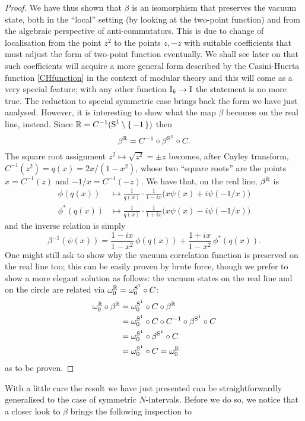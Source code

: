 \begin{proof}
\bigskip 
We have thus shown that $\beta$ is an isomorphism that 
preserves the vacuum state, both in the ``local'' setting
(by looking at the two-point function) and from the 
algebraic perspective of anti-commutators.
This is due to change of localisation from the point 
$z^2$ to the points $z,-z$ with suitable coefficients that
must adjust the form of two-point function eventually. We shall 
see later on that such coefficients will acquire a more
general form described by the Casini-Huerta function 
\eqref{CHfunction} in the context of modular theory and this 
will come as a very special feature; with any other function 
$\textrm{I}_k\to \textrm{I}$ the statement is no more true. The 
reduction to special symmetric case brings back the form 
we have just analysed. However, it is 
interesting to show what the map $\beta$ becomes on the 
real line, instead. Since $\mathbb{R}=C^{-1}(\textrm{S}^1\setminus\set{-1})$ 
then 
\[
\beta^{\mathbb{R}}=C^{-1}\circ\beta^{\textrm{S}^1}\circ C.
\]
The square root assignment $z^2\mapsto\sqrt{z^2}=\pm z$
becomes, after Cayley transform, 
$C^{-1}(z^2)=q(x)=2x/(1-x^2)$, whose two 
``square roots'' are the points $x=C^{-1}(z)$ and
$-1/x=C^{-1}(-z)$.
We have that, on the real line, $\beta^{\mathbb{R}}$ is
\begin{align*}
\phi(q(x))&\mapsto\frac{1}{q(x)}\cdot\frac{1}{1-ix}
\Big(x\psi(x)+i\psi(-1/x)\Big)\\
\phi^*(q(x))&\mapsto\frac{1}{q(x)}\cdot\frac{1}{1+ix}
\Big(x\psi(x)-i\psi(-1/x)\Big)
\end{align*}
and the inverse relation is simply
\[
\beta^{-1}(\psi(x))=\frac{1-ix}{1-x^2}\,\phi(q(x)) +
\frac{1+ix}{1-x^2}\,\phi^*(q(x)).
\]
One might still ask to show why the vacuum correlation 
function is preserved on the real line too; this can be
easily proven by brute force, though we prefer to show a
more elegant solution as follows: the vacuum states on the 
real line and on the circle are related via $\omega_0^{\mathbb{R}}=
\omega_0^{\textrm{S}^1}\circ C$:
\begin{align*}
\omega_0^{\mathbb{R}}\circ\beta^{\mathbb{R}}&=\omega_0^{\textrm{S}^1}\circ C\circ\beta^{\mathbb{R}}\\
&=\omega_0^{\textrm{S}^1}\circ C\circ C^{-1}\circ\beta^{\textrm{S}^1}\circ C\\
&=\omega_0^{\textrm{S}^1}\circ\beta^{\textrm{S}^1}\circ C\\
&=\omega_0^{\textrm{S}^1}\circ C=\omega_0^{\mathbb{R}}
\end{align*}
as to be proven. \qedhere
\end{proof}
With a little care the result we have just presented can be 
straightforwardly generalised to the case of symmetric $N$-intervals. 
Before we do so, we notice that
a closer look to $\beta$ brings the following inspection to 
